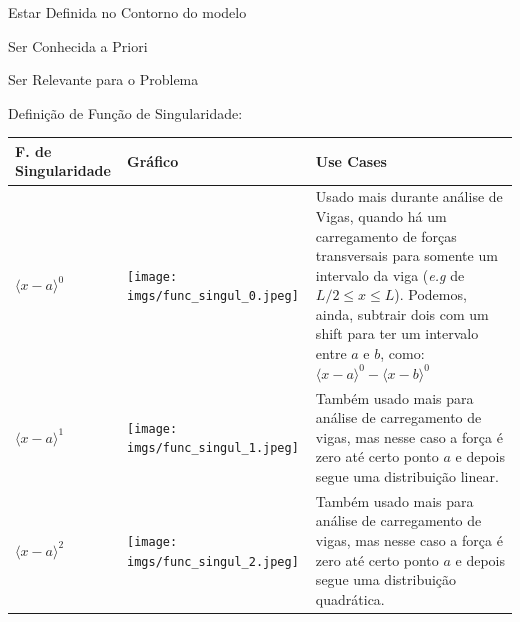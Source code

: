 \documentclass{article}
\begin{document}
\begin{todolist}\tiny
    \item Estar Definida no Contorno do modelo
    \item Ser Conhecida a Priori
    \item Ser Relevante para o Problema
\end{todolist}

Definição de Função de Singularidade:
\begin{table}[h]
    \tiny
    \centering
    \begin{tabularx}{\textwidth}{|X|X|l|}\hline
        \textbf{F. de Singularidade}                                   & \textbf{Gráfico} & \textbf{Use Cases}                                                             \\ \hline
        $\langle x - a\rangle^0$                                       &
        \begin{minipage}{.3\textwidth}
            \centering
            \texttt{[image: imgs/func\_singul\_0.jpeg]}
        \end{minipage}  &
        \begin{minipage}{.4\textwidth}
            Usado mais durante análise de Vigas, quando há um carregamento de forças transversais para somente um intervalo da viga (\emph{e.g} de $L/2 \le x \le L$). Podemos,
            ainda, subtrair dois com um shift para ter um intervalo entre $a$ e $b$, como: $\langle x - a\rangle^0 - \langle x - b\rangle^0$
        \end{minipage} \\ \hline

        $\langle x - a\rangle^1$                                       &
        \begin{minipage}{.3\textwidth}
            \centering
            \texttt{[image: imgs/func\_singul\_1.jpeg]}
        \end{minipage}  &
        \begin{minipage}{.4\textwidth}
            Também usado mais para análise de carregamento de vigas, mas nesse caso a força é zero até certo ponto $a$ e depois segue uma distribuição linear.
        \end{minipage}                  \\ \hline

        $\langle x - a\rangle^2$                                       &
        \begin{minipage}{.3\textwidth}
            \centering
            \texttt{[image: imgs/func\_singul\_2.jpeg]}
        \end{minipage}  &
        \begin{minipage}{.4\textwidth}
            Também usado mais para análise de carregamento de vigas, mas nesse caso a força é zero até certo ponto $a$ e depois segue uma distribuição quadrática.
        \end{minipage}              \\ \hline


\end{tabularx}
\end{table}
\end{document}
